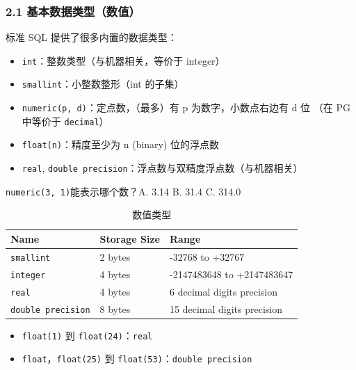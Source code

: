 \documentclass[aspectratio=169, 14pt]{beamer}
\begin{document}
\begin{frame}
	\frametitle{2.1 基本数据类型（数值）}
	标准 SQL 提供了很多内置的数据类型：
	\begin{itemize}
		\item \texttt{int}：整数类型（与机器相关，等价于 integer）
		\item \texttt{smallint}：小整数整形（int 的子集）
		\item \texttt{numeric(p, d)}：定点数，（最多）有 p 为数字，小数点右边有 d 位 （在 PG 中等价于 \texttt{decimal}）
		\item \texttt{float(n)}：精度至少为 n (binary) 位的浮点数
		\item \texttt{real}, \texttt{double precision}：浮点数与双精度浮点数（与机器相关）
	\end{itemize}
	\pause
	{\large {}} \texttt{numeric(3, 1)}能表示哪个数？A. 3.14 B. 31.4 C. 314.0
\end{frame}

\begin{frame}
	\begin{table}
		\caption{数值类型}
		\begin{tabular}{lll}
			\toprule
			Name                      & Storage Size & Range                       \\
			\midrule
			\texttt{smallint}         & 2 bytes      & -32768 to +32767            \\
			\texttt{integer}          & 4 bytes      & -2147483648 to +2147483647  \\
			\texttt{real}             & 4 bytes      & 6 decimal digits precision  \\
			\texttt{double precision} & 8 bytes      & 15 decimal digits precision \\
			\bottomrule
		\end{tabular}
	\end{table}

	\begin{itemize}
		\item \texttt{float(1)} 到 \texttt{float(24)}：\texttt{real}
		\item \texttt{float}，\texttt{float(25)} 到 \texttt{float(53)}：\texttt{double precision}
	\end{itemize}
\end{frame}
\end{document}
